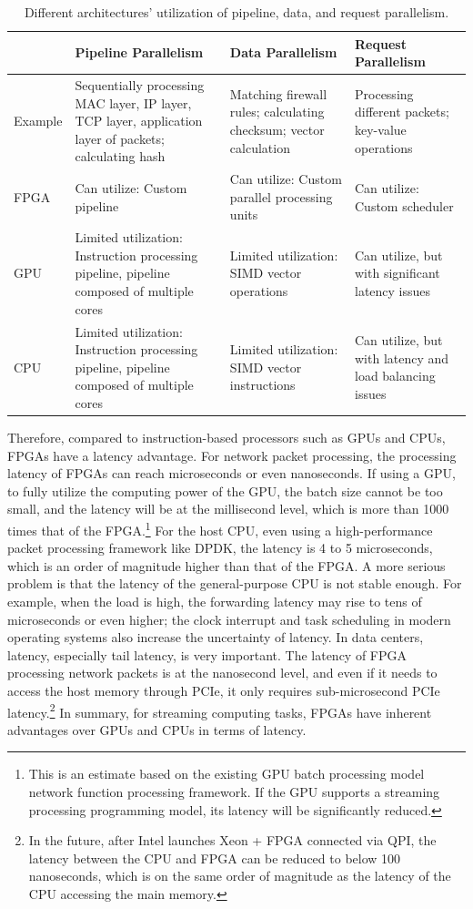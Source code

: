 \begin{table}[htbp]
	\centering
	\caption{Different architectures' utilization of pipeline, data, and request parallelism.}
	\small
	\begin{tabular}{l|p{}|p{}|p{}}
		\hline
		& Pipeline Parallelism & Data Parallelism & Request Parallelism \\
		\hline
		\hline
		Example & Sequentially processing MAC layer, IP layer, TCP layer, application layer of packets; calculating hash & Matching firewall rules; calculating checksum; vector calculation & Processing different packets; key-value operations \\
		\hline
		FPGA & Can utilize: Custom pipeline & Can utilize: Custom parallel processing units & Can utilize: Custom scheduler \\
		\hline
		GPU & Limited utilization: Instruction processing pipeline, pipeline composed of multiple cores & Limited utilization: SIMD vector operations & Can utilize, but with significant latency issues \\
		\hline
		CPU & Limited utilization: Instruction processing pipeline, pipeline composed of multiple cores & Limited utilization: SIMD vector instructions & Can utilize, but with latency and load balancing issues \\
		\hline
	\end{tabular}
	\label{background:tab:fpga-parallelism}
\end{table}


Therefore, compared to instruction-based processors such as GPUs and CPUs, FPGAs have a latency advantage. For network packet processing, the processing latency of FPGAs can reach microseconds or even nanoseconds. If using a GPU, to fully utilize the computing power of the GPU, the batch size cannot be too small, and the latency will be at the millisecond level, which is more than 1000 times that of the FPGA.\footnote{This is an estimate based on the existing GPU batch processing model network function processing framework. If the GPU supports a streaming processing programming model, its latency will be significantly reduced.} For the host CPU, even using a high-performance packet processing framework like DPDK, the latency is 4 to 5 microseconds, which is an order of magnitude higher than that of the FPGA. A more serious problem is that the latency of the general-purpose CPU is not stable enough. For example, when the load is high, the forwarding latency may rise to tens of microseconds or even higher; the clock interrupt and task scheduling in modern operating systems also increase the uncertainty of latency. In data centers, latency, especially tail latency, is very important. The latency of FPGA processing network packets is at the nanosecond level, and even if it needs to access the host memory through PCIe, it only requires sub-microsecond PCIe latency.\footnote{In the future, after Intel launches Xeon + FPGA connected via QPI, the latency between the CPU and FPGA can be reduced to below 100 nanoseconds, which is on the same order of magnitude as the latency of the CPU accessing the main memory.} In summary, for streaming computing tasks, FPGAs have inherent advantages over GPUs and CPUs in terms of latency.

